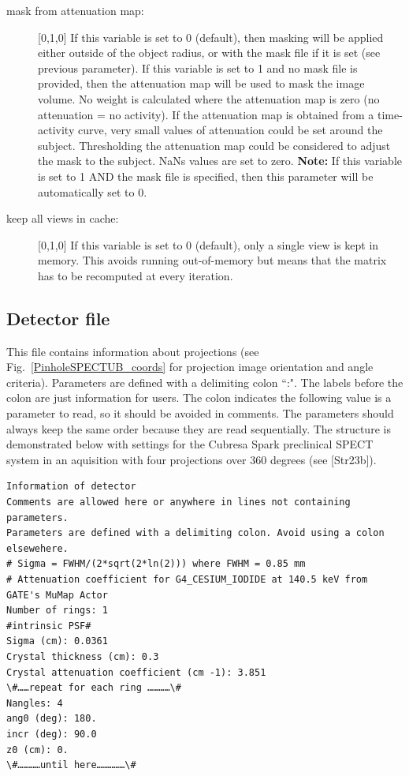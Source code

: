 \documentclass{article}
\begin{document}
{{\begin{description}
\item[mask from attenuation map:]  [0,1,0{]} If this variable is set to 0 (default), then masking will be applied either outside of the object radius, or with the mask file if it is set (see previous parameter). If this variable is set to 1 and no mask file is provided, then the attenuation map will be used to mask the image volume. No weight is calculated where the attenuation map is zero (no attenuation = no activity). If the attenuation map is obtained from a time-activity curve, very small values of attenuation could be set around the subject. Thresholding the attenuation map could be considered to adjust the mask to the subject. NaNs values are set to zero. \textbf{Note:} If this variable is set to 1 AND the mask file is specified, then this parameter will be automatically set to 0.

\item[keep all views in cache:] [0,1,0{]} If this variable is set to 0 (default), only a single view is kept in memory. This avoids running out-of-memory but means that the matrix has to be recomputed at every iteration.

\end{description}

{ {\subsection*{{Detector file} }
This file contains information about projections (see Fig.~\ref{PinholeSPECTUB_coords} for projection image orientation and angle criteria). Parameters are defined with a delimiting colon ``:". The labels before the colon are just information for users. The colon indicates the following value is a parameter to read, so it should be avoided in comments. The parameters should always keep the same order because they are read sequentially. The structure is demonstrated below with settings for the Cubresa Spark preclinical SPECT system in an aquisition with four projections over 360 degrees (see [Str23b]).

\begin{verbatim}
Information of detector
Comments are allowed here or anywhere in lines not containing parameters.
Parameters are defined with a delimiting colon. Avoid using a colon elsewehere.
# Sigma = FWHM/(2*sqrt(2*ln(2))) where FWHM = 0.85 mm
# Attenuation coefficient for G4_CESIUM_IODIDE at 140.5 keV from GATE's MuMap Actor
Number of rings: 1
#intrinsic PSF#
Sigma (cm): 0.0361
Crystal thickness (cm): 0.3
Crystal attenuation coefficient (cm -1): 3.851   
\#……repeat for each ring …………\#
Nangles: 4
ang0 (deg): 180.
incr (deg): 90.0
z0 (cm): 0.
\#…………until here……………\#
\end{verbatim}

}}}}
\end{document}
